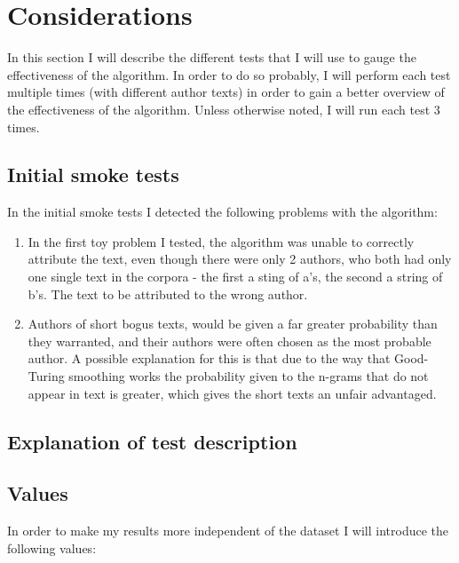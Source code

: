 \section{Considerations}
\label{considerations}

In this section I will describe the different tests that I will use to gauge the effectiveness of the algorithm. In order to do so probably, I will perform each test multiple times (with different author texts) in order to gain a better overview of the effectiveness of the algorithm. Unless otherwise noted, I  will run each test 3 times.

\subsection{Initial smoke tests}
\label{smokeTest}
In the initial smoke tests I detected the following problems with the algorithm:
\begin{enumerate}
\item In the first toy problem I tested, the algorithm was unable to correctly attribute the text, even though there were only 2 authors, who both had only one single text in the corpora - the first a sting of a's, the second a string of b's. The text to be attributed to the wrong author.

\item Authors of short bogus texts, would be given a far greater probability than they warranted, and their authors were often chosen as the most probable author. A possible explanation for this is that due to the way that Good-Turing smoothing works the probability given to the n-grams that do not appear in text is greater, which gives the short texts an unfair advantaged. 
\end{enumerate}
 

\subsection{Explanation of test description}

\subsection{Values}
In order to make my results more independent of the dataset I will introduce the following values:

